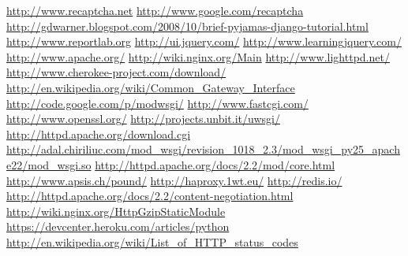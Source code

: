 \documentclass[justified,sixbynine,notoc]{tufte-book}
\begin{document}
\begin{thebibliography}{999}
 \url{http://www.recaptcha.net}
 \url{http://www.google.com/recaptcha}
 \url{http://gdwarner.blogspot.com/2008/10/brief-pyjamas-django-tutorial.html}
 \url{http://www.reportlab.org}
 \url{http://ui.jquery.com/}
 \url{http://www.learningjquery.com/}
 \url{http://www.apache.org/}
 \url{http://wiki.nginx.org/Main}
 \url{http://www.lighttpd.net/}
 \url{http://www.cherokee-project.com/download/}
 \url{http://en.wikipedia.org/wiki/Common_Gateway_Interface}
 \url{http://code.google.com/p/modwsgi/}
 \url{http://www.fastcgi.com/}
 \url{http://www.openssl.org/}
 \url{http://projects.unbit.it/uwsgi/}
 \url{http://httpd.apache.org/download.cgi}
 \url{http://adal.chiriliuc.com/mod_wsgi/revision_1018_2.3/mod_wsgi_py25_apache22/mod_wsgi.so}
 \url{http://httpd.apache.org/docs/2.2/mod/core.html}
 \url{http://www.apsis.ch/pound/}
 \url{http://haproxy.1wt.eu/}
 \url{http://redis.io/}
 \url{http://httpd.apache.org/docs/2.2/content-negotiation.html}
 \url{http://wiki.nginx.org/HttpGzipStaticModule}
 \url{https://devcenter.heroku.com/articles/python}
 \url{http://en.wikipedia.org/wiki/List_of_HTTP_status_codes}
\end{thebibliography}
\end{document}
